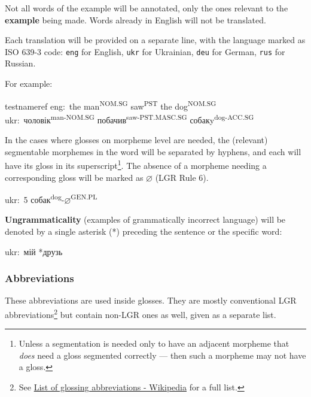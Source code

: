 Not all words of the example will be annotated, only the ones relevant
to the \textbf{example} being made. Words already in English will not be
translated.

Each translation will be provided on a separate line, with the language
marked as ISO 639-3 code: \texttt{eng} for English, \texttt{ukr} for
Ukrainian, \texttt{deu} for German, \texttt{rus} for Russian.

For example:

\begin{gloss}[Example]{testnameref}
eng: the man\textsuperscript{NOM.SG} saw\textsuperscript{PST} the
dog\textsuperscript{NOM.SG}\\
ukr: чоловік\textsuperscript{man-NOM.SG} побачив\textsuperscript{saw-PST.MASC.SG}
собакy\textsuperscript{dog-ACC.SG}
\end{gloss}

In the cases where glosses on morpheme level are needed, the (relevant)
segmentable morphemes in the word will be separated by hyphens, and each
will have its gloss in its superscript\footnote{Unless a segmentation is
  needed only to have an adjacent morpheme that \emph{does} need a gloss
  segmented correctly --- then such a morpheme may not have a gloss.}.
The absence of a morpheme needing a corresponding gloss will be marked
as \(\varnothing\) (LGR Rule 6).

\begin{gloss}{}
ukr: 5 собак\textsuperscript{dog}-\(\varnothing\)\textsuperscript{GEN.PL}
\end{gloss}

\textbf{Ungrammaticality} (examples of grammatically incorrect language)
will be denoted by a single asterisk (*) preceding the sentence or the
specific word:

\begin{gloss}{}
ukr: мій *друзь
\end{gloss}{}

\subsubsection{Abbreviations}\label{abbreviations-1}

These abbreviations are used inside glosses. They are mostly
conventional LGR abbreviations\footnote{See
  \href{https://en.wikipedia.org/wiki/List_of_glossing_abbreviations}{List
  of glossing abbreviations - Wikipedia} for a full list.} but contain
non-LGR ones as well, given as a separate list.

